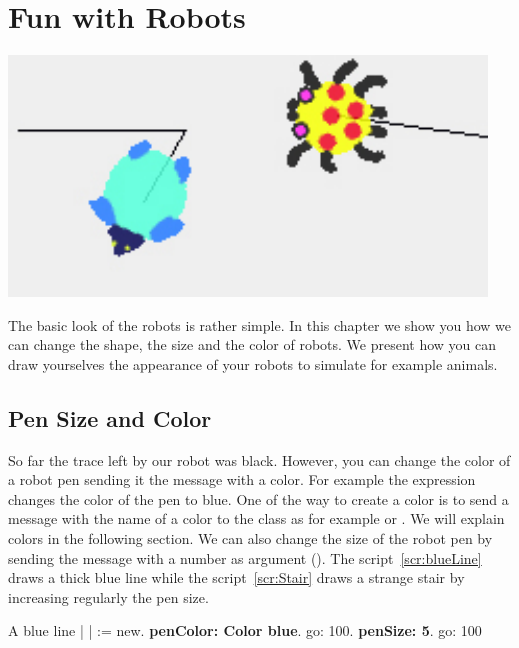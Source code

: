 
\ifx\wholebook\relax\else



\fi


\chapter{Fun with Robots}\label{cha:custo}

\begin{chapterfigure}
\includegraphics{beasts}
\end{chapterfigure}

The basic look of the robots is rather simple. In this chapter we show you how we can change the shape, the size and the color of robots. We present how you can draw yourselves the appearance of your robots to simulate for example animals.  


\section{Pen Size and Color}
So far the trace left by our robot was black. However, you can change the color of a robot pen sending it the message  with a color. For example the expression  changes the color of the pen to blue. One of the way to create a color is to send a message with the name of a color to the class  as for example   or . We will explain colors in the following section. We can also change the size of the robot pen by sending the message  with a number as argument ().  The script~\ref{scr:blueLine} draws a thick blue line while the script~\ref{scr:Stair} draws a strange stair by increasing regularly the pen size.

\begin{scriptwithtitle}{A blue line}\label{scr:blueLine}
| \caro |
\caro := \Turtle new.
\caro \textbf{penColor: Color blue}.
\caro go: 100.
\caro \textbf{penSize: 5}.
\caro go: 100
\end{scriptwithtitle}


